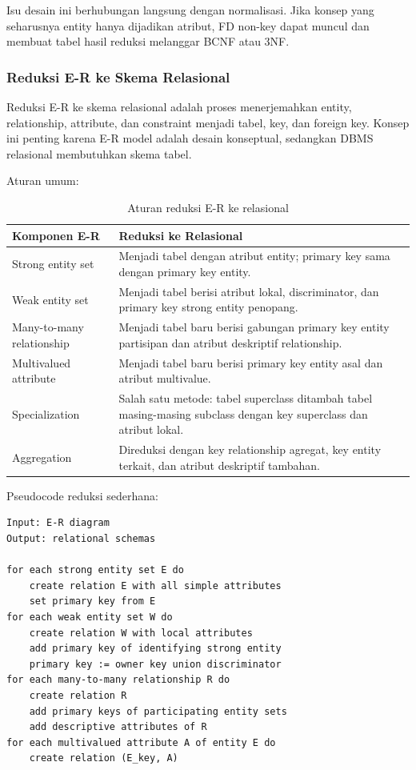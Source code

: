 Isu desain ini berhubungan langsung dengan normalisasi. Jika konsep yang seharusnya entity hanya dijadikan atribut, FD non-key dapat muncul dan membuat tabel hasil reduksi melanggar BCNF atau 3NF.

\subsubsection{Reduksi E-R ke Skema Relasional}

\begin{jawab}
Reduksi E-R ke skema relasional adalah proses menerjemahkan entity, relationship, attribute, dan constraint menjadi tabel, key, dan foreign key. Konsep ini penting karena E-R model adalah desain konseptual, sedangkan DBMS relasional membutuhkan skema tabel.
\end{jawab}

Aturan umum:
\begin{table}[H]
\centering
\small
\begin{tabularx}{\textwidth}{|L{0.26\textwidth}|X|}
\hline
\textbf{Komponen E-R} & \textbf{Reduksi ke Relasional} \\
\hline
Strong entity set & Menjadi tabel dengan atribut entity; primary key sama dengan primary key entity. \\
\hline
Weak entity set & Menjadi tabel berisi atribut lokal, discriminator, dan primary key strong entity penopang. \\
\hline
Many-to-many relationship & Menjadi tabel baru berisi gabungan primary key entity partisipan dan atribut deskriptif relationship. \\
\hline
Multivalued attribute & Menjadi tabel baru berisi primary key entity asal dan atribut multivalue. \\
\hline
Specialization & Salah satu metode: tabel superclass ditambah tabel masing-masing subclass dengan key superclass dan atribut lokal. \\
\hline
Aggregation & Direduksi dengan key relationship agregat, key entity terkait, dan atribut deskriptif tambahan. \\
\hline
\end{tabularx}
\caption{Aturan reduksi E-R ke relasional}
\label{tab:er-reduction}
\end{table}

Pseudocode reduksi sederhana:
\begin{lstlisting}[caption={Pseudocode reduksi E-R ke skema relasional}, label={lst:er-reduction}]
Input: E-R diagram
Output: relational schemas

for each strong entity set E do
    create relation E with all simple attributes
    set primary key from E
for each weak entity set W do
    create relation W with local attributes
    add primary key of identifying strong entity
    primary key := owner key union discriminator
for each many-to-many relationship R do
    create relation R
    add primary keys of participating entity sets
    add descriptive attributes of R
for each multivalued attribute A of entity E do
    create relation (E_key, A)
\end{lstlisting}


